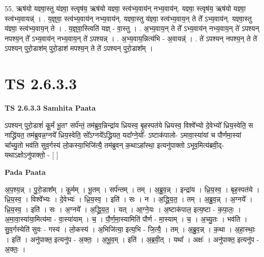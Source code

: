 \documentclass[17pt]{extarticle}
\begin{document}
55. ऋष॑यो यज्ञ्वा॒स्तु य॑ज्ञ्वा॒ स्त्वृष॑य॒ ऋष॑यो यज्ञ्वा॒ स्त्व॑भ्य॒वाय॑न् नभ्य॒वाय॑न्. यज्ञ्वा॒ स्त्वृष॑य॒ ऋष॑यो यज्ञ्वा॒ स्त्व॑भ्य॒वायन्न्॑ । . य॒ज्ञ्॒वा॒ स्त्व॑भ्य॒वाय॑न् नभ्य॒वाय॑न्. यज्ञ्वा॒स्तु य॑ज्ञ्वा॒ स्त्व॑भ्य॒वाय॒न् ते ते᳚ ऽभ्य॒वाय॑न्. यज्ञ्वा॒स्तु य॑ज्ञ्वा॒ स्त्व॑भ्य॒वाय॒न् ते । . य॒ज्ञ्॒वा॒स्त्विति॑ यज्ञ् - वा॒स्तु । . अ॒भ्य॒वाय॒न् ते ते᳚ ऽभ्य॒वाय॑न् नभ्य॒वाय॒न् ते॑ ऽपश्यन् नपश्य॒न् ते᳚ ऽभ्य॒वाय॑न् नभ्य॒वाय॒न् ते॑ ऽपश्यन्न् । . अ॒भ्य॒वाय॒न्नित्य॑भि - अ॒वायन्न्॑ । . ते॑ ऽपश्यन् नपश्य॒न् ते ते॑ ऽपश्यन् पुरो॒डाश॑म् पुरो॒डाश॑ मपश्य॒न् ते ते॑ ऽपश्यन् पुरो॒डाश᳚म् । \newline
\pagebreak
{}
\section*{ TS 2.6.3.3 }

\textbf{TS 2.6.3.3 } \newline
\textbf{Samhita Paata} \newline

ऽपश्यन् पुरो॒डाशं॑ कू॒र्मं भू॒तꣳ सर्प॑न्तं॒ तम॑ब्रुव॒न्निन्द्रा॑य ध्रियस्व॒ बृ॒हस्पत॑ये ध्रियस्व॒ विश्वे᳚भ्यो दे॒वेभ्यो᳚ ध्रिय॒स्वेति॒ स नाद्ध्रि॑यत॒ तम॑ब्रुवन्न॒ग्नये᳚ ध्रिय॒स्वेति॒ सो᳚ऽग्नये᳚ऽद्ध्रियत॒ यदा᳚ग्ने॒यो᳚- ऽष्टाक॑पालो- ऽमावा॒स्या॑यां च पौर्णमा॒स्यां चा᳚च्यु॒तो भव॑ति सुव॒र्गस्य॑ लो॒कस्या॒भिजि॑त्यै॒ तम॑ब्रुवन् क॒थाऽहा᳚स्था॒ इत्यनु॑पाक्तो ऽभूव॒मित्य॑ब्रवी॒द्-यथाऽक्षोऽनु॑पाक्तो॒ - [  ] \newline

\textbf{Pada Paata} \newline

अ॒प॒श्य॒न्न् । पु॒रो॒डाश᳚म् । कू॒र्मम् । भू॒तम् । सर्प॑न्तम् । तम् । अ॒ब्रु॒व॒न्न् । इन्द्रा॑य । ध्रि॒य॒स्व॒ । बृह॒स्पत॑ये । ध्रि॒य॒स्व॒ । विश्वे᳚भ्यः । दे॒वेभ्यः॑ । ध्रि॒य॒स्व॒ । इति॑ । सः । न । अ॒द्ध्रि॒य॒त॒ । तम् । अ॒ब्रु॒व॒न्न् । अ॒ग्नये᳚ । ध्रि॒य॒स्व॒ । इति॑ । सः । अ॒ग्नये᳚ । अ॒द्ध्रि॒य॒त॒ । यत् । आ॒ग्ने॒यः । अ॒ष्टाक॑पाल॒ इत्य॒ष्टा - क॒पा॒लः॒ । अ॒मा॒वा॒स्या॑या॒मित्य॑मा - वा॒स्या॑याम् । च॒ । पौ॒र्ण॒मा॒स्यामिति॑ पौर्ण - मा॒स्याम् । च॒ । अ॒च्यु॒तः । भव॑ति । सु॒व॒र्गस्येति॑ सुवः - गस्य॑ । लो॒कस्य॑ । अ॒भिजि॑त्या॒ इत्य॒भि - जि॒त्यै॒ । तम् । अ॒ब्रु॒व॒न्न् । क॒था । अ॒हा॒स्थाः॒ । इति॑ । अनु॑पाक्त॒ इत्यनु॑प - अ॒क्तः॒ । अ॒भू॒व॒म् । इति॑ । अ॒ब्र॒वी॒त् । यथा᳚ । अक्षः॑ । अनु॑पाक्त॒ इत्यनु॑प - अ॒क्तः॒ ।  \newline
\end{document}
